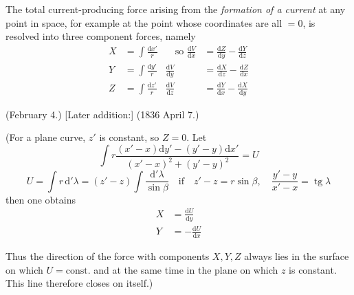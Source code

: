 \vspace{4mm}
The total current-producing force arising from the \textit{formation of a current} at any point in space, for example at the point whose coordinates are all $=0$, is resolved into three component forces, namely
\[
\begin{aligned}
X&=\int\frac{\mathrm dx'}{r}&\quad\text{so }\frac{\mathrm dV}{\mathrm dx}&=\frac{\mathrm dZ}{\mathrm dy}-\frac{\mathrm dY}{\mathrm dz}\\[4pt]
Y&=\int\frac{\mathrm dy'}{r}&\frac{\mathrm dV}{\mathrm dy}&=\frac{\mathrm dX}{\mathrm dz}-\frac{\mathrm dZ}{\mathrm dx}\\[4pt]
Z&=\int\frac{\mathrm dz'}{r}&\frac{\mathrm dV}{\mathrm dz}&=\frac{\mathrm dY}{\mathrm dx}-\frac{\mathrm dX}{\mathrm dy}
\end{aligned}
\]

(February 4.) [Later addition:] (1836 April 7.)

(For a plane curve, $z'$ is constant, so $Z=0$. Let
\[
\int r\frac{(x'-x)\mathrm dy'-(y'-y)\mathrm dx'}{(x'-x)^2+(y'-y)^2}=U
\]
\[
U=\int r\,\mathrm d'\lambda=(z'-z)\int\frac{\mathrm d'\lambda}{\sin\beta}\quad\text{if}\quad z'-z=r\sin\beta,\quad\frac{y'-y}{x'-x}=\operatorname{tg}\lambda
\]
then one obtains
\[
\begin{aligned}
X&=\frac{\mathrm dU}{\mathrm dy}\\[4pt]
Y&=-\frac{\mathrm dU}{\mathrm dx}
\end{aligned}
\]

Thus the direction of the force with components $X,Y,Z$ always lies in the surface on which $U=\text{const.}$ and at the same time in the plane on which $z$ is constant. This line therefore closes on itself.)

